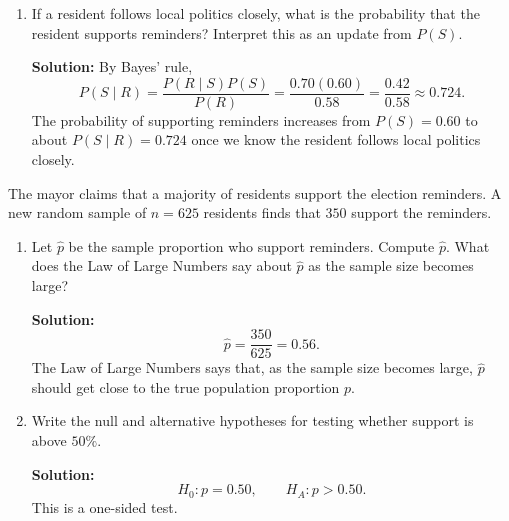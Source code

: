 \documentclass[11pt]{exam}
\begin{document}
\begin{questions}
\begin{enumerate}[leftmargin = 0.5cm, label = (\alph*), rightmargin = 0.2cm]
    \begin{solutionorbox}[4.8cm]
    \textbf{Solution:} Since $S$ and $S^c$ form a partition,
    \[
    P(R)=P(R\mid S)P(S)+P(R\mid S^c)P(S^c).
    \]
    Hence,
    \[
    P(R)=0.70(0.60)+0.40(0.40)=0.42+0.16=0.58.
    \]
    \end{solutionorbox}

    \item If a resident follows local politics closely, what is the probability that the resident supports reminders? Interpret this as an update from $P(S)$.

    \begin{solutionorbox}[5.2cm]
    \textbf{Solution:} By Bayes' rule,
    \[
    P(S\mid R)=\frac{P(R\mid S)P(S)}{P(R)}
    =\frac{0.70(0.60)}{0.58}
    =\frac{0.42}{0.58}\approx 0.724.
    \]
    The probability of supporting reminders increases from $P(S)=0.60$ to about $P(S\mid R)=0.724$ once we know the resident follows local politics closely.
    \end{solutionorbox}
\end{enumerate}

\newpage
\question[2.5]
The mayor claims that a majority of residents support the election reminders. A new random sample of $n=625$ residents finds that $350$ support the reminders.

\begin{enumerate}[leftmargin = 0.5cm, label = (\alph*), rightmargin = 0.2cm]
    \item Let $\widehat p$ be the sample proportion who support reminders. Compute $\widehat p$. What does the Law of Large Numbers say about $\widehat p$ as the sample size becomes large?

    \begin{solutionorbox}[5.1cm]
    \textbf{Solution:}
    \[
    \widehat p=\frac{350}{625}=0.56.
    \]
    The Law of Large Numbers says that, as the sample size becomes large, $\widehat p$ should get close to the true population proportion $p$.
    \end{solutionorbox}

    \item Write the null and alternative hypotheses for testing whether support is above $50\%$.

    \begin{solutionorbox}[3.6cm]
    \textbf{Solution:}
    \[
    H_0:p=0.50, \qquad H_A:p>0.50.
    \]
    This is a one-sided test.
    \end{solutionorbox}


\end{enumerate}
\end{questions}
\end{document}
